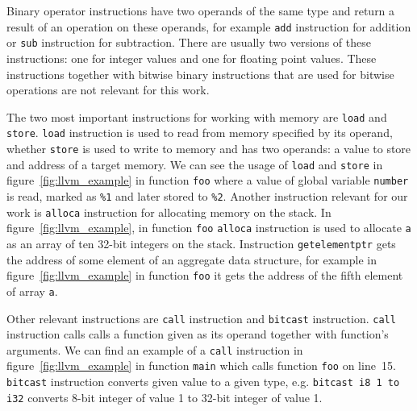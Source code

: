 Binary operator instructions have two operands of the same type and return a
result of an operation on these operands, for example \texttt{add} instruction
for addition or \texttt{sub} instruction for subtraction. There are usually two
versions of these instructions: one for integer values and one for floating
point values. These instructions together with bitwise binary instructions
that are used for bitwise operations are not relevant for this work.

The two most important instructions for working with memory are \texttt{load}
and \texttt{store}. \texttt{load} instruction is used to read from memory
specified by its operand, whether \texttt{store} is used to write to memory and
has two operands: a value to store and address of a target memory. We can see
the usage of \texttt{load} and \texttt{store} in figure~\ref{fig:llvm_example}
in function \texttt{foo} where a value of global variable \texttt{number} is
read, marked as \texttt{\%1} and later stored to \texttt{\%2}. Another
instruction relevant for our work is \texttt{alloca} instruction for allocating
memory on the stack. In figure~\ref{fig:llvm_example}, in function \texttt{foo}
\texttt{alloca} instruction is used to allocate \texttt{a} as an array of ten
32-bit integers on the stack. Instruction \texttt{getelementptr} gets the
address of some element of an aggregate data structure, for example in
figure~\ref{fig:llvm_example} in function \texttt{foo} it gets the address of
the fifth element of array \texttt{a}.

Other relevant instructions are \texttt{call} instruction and \texttt{bitcast}
instruction. \texttt{call} instruction calls calls a function given as its
operand together with function's arguments. We can find an example of a
\texttt{call} instruction in figure~\ref{fig:llvm_example} in function
\texttt{main} which calls function \texttt{foo} on line~15. \texttt{bitcast}
instruction converts given value to a given type, e.g. \texttt{bitcast i8 1 to
i32} converts 8-bit integer of value 1 to 32-bit integer of value 1.
